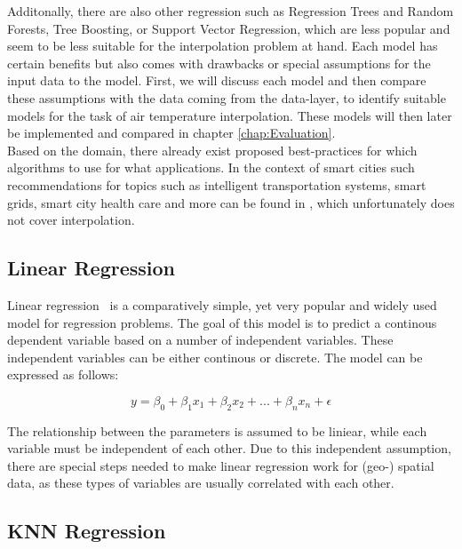 Additonally, there are also other regression such as Regression Trees and Random Forests, Tree Boosting, or Support Vector Regression, which are less popular and seem to be less suitable for the interpolation problem at hand.
Each model has certain benefits but also comes with drawbacks or special assumptions for the input data to the model. First, we will discuss each model and then compare these assumptions with the data coming from the data-layer, to identify suitable models for the task of air temperature interpolation. These models will then later be implemented and compared in chapter \ref{chap:Evaluation}.\\
Based on the domain, there already exist proposed best-practices for which algorithms to use for what applications. In the context of smart cities such recommendations for topics such as intelligent transportation systems, smart grids, smart city health care and more can be found in \cite{ullah2020applications}, which unfortunately does not cover interpolation.


\subsection{Linear Regression}
\label{subsec: linear regression}

Linear regression~\cite{montgomery2021introduction} is a comparatively simple, yet very popular and widely used model for regression problems. The goal of this model is to predict a continous dependent variable based on a number of independent variables. These independent variables can be either continous or discrete. The model can be expressed as follows:

\begin{equation}
    y = \beta_0 + \beta_1 x_1 + \beta_2 x_2 + ... + \beta_n x_n + \epsilon
\end{equation}

The relationship between the parameters is assumed to be liniear, while each variable must be independent of each other. Due to this independent assumption, there are special steps needed to make linear regression work for (geo-) spatial data, as these types of variables are usually correlated with each other.

\subsection{KNN Regression}

